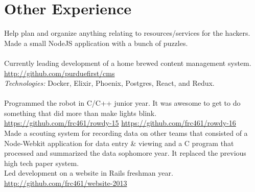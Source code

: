 \documentclass[11pt,letter,sans]{moderncv}
\begin{document}
\section{Other Experience}
Help plan and organize anything relating to resources/services for the hackers.
Made a small NodeJS application with a bunch of puzzles.
\\
\\
Currently leading development of a home brewed content management system. \url{http://github.com/purduefirst/cms}
\\
\textit{Technologies:} Docker, Elixir, Phoenix, Postgres, React, and Redux.
\\
\\
Programmed the robot in C/C++ junior year.
It was awesome to get to do something that did more than make lights blink.
\url{https://github.com/frc461/rowdy-15} \url{https://github.com/frc461/rowdy-16}
\\
Made a scouting system for recording data on other teams that consisted of a Node-Webkit application for data entry \& viewing and a C program that processed and summarized the data sophomore year.
It replaced the previous high tech paper system.
\\
Led development on a website in Rails freshman year. \url{http://github.com/frc461/website-2013}
\\
\\
\end{document}
